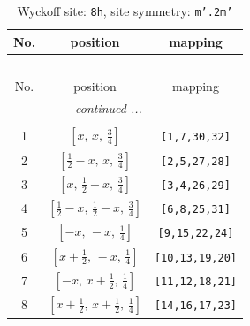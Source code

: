 \documentclass[fleqn,8pt]{jsarticle}
\begin{document}
\begin{longtable}{ccc}
\caption{Wyckoff site: {\tt 8h}, site symmetry: {\tt m'.2m'}}
 \\
 \hline \hline
No. & position & mapping \\ \hline \endfirsthead

\multicolumn{2}{l}{\tablename\ \thetable{}} \\
 \hline \hline
No. & position & mapping \\ \hline \endhead

 \hline \hline
\multicolumn{2}{r}{\footnotesize\it continued ...} \\ \endfoot

 \hline \hline
\multicolumn{2}{r}{} \\ \endlastfoot

1 & $\left[ x,\, x,\, \frac{3}{4} \right]$ & {\tt [1,7,30,32]} \\ \hline
2 & $\left[ \frac{1}{2} - x,\, x,\, \frac{3}{4} \right]$ & {\tt [2,5,27,28]} \\ \hline
3 & $\left[ x,\, \frac{1}{2} - x,\, \frac{3}{4} \right]$ & {\tt [3,4,26,29]} \\ \hline
4 & $\left[ \frac{1}{2} - x,\, \frac{1}{2} - x,\, \frac{3}{4} \right]$ & {\tt [6,8,25,31]} \\ \hline
5 & $\left[ - x,\, - x,\, \frac{1}{4} \right]$ & {\tt [9,15,22,24]} \\ \hline
6 & $\left[ x + \frac{1}{2},\, - x,\, \frac{1}{4} \right]$ & {\tt [10,13,19,20]} \\ \hline
7 & $\left[ - x,\, x + \frac{1}{2},\, \frac{1}{4} \right]$ & {\tt [11,12,18,21]} \\ \hline
8 & $\left[ x + \frac{1}{2},\, x + \frac{1}{2},\, \frac{1}{4} \right]$ & {\tt [14,16,17,23]} \\
\end{longtable}
\renewcommand{\arraystretch}{1.2}
\end{document}
